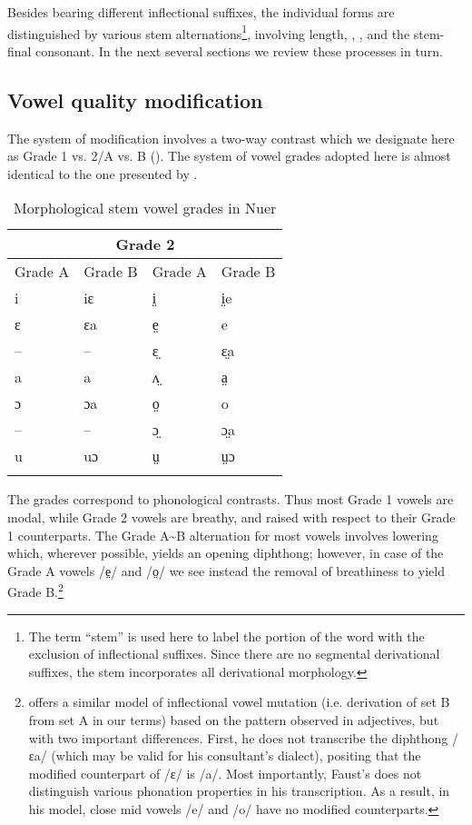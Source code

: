 \documentclass[output=paper,newtxmath,modfonts,nonflat]{langsci/langscibook}
\begin{document}
Besides bearing different inflectional suffixes, the individual forms are distinguished by various stem alternations\footnote{The term “stem” is used here to label the portion of the word with the exclusion of inflectional suffixes. Since there are no segmental derivational suffixes, the stem incorporates all derivational morphology.}, involving length, , , and the stem-final consonant. In the next several sections we review these processes in turn. 

\subsection{Vowel quality modification} %

The system of  modification involves a two-way contrast which we designate here as Grade 1 vs. 2/A vs. B (). The system of vowel grades adopted here is almost identical to the one presented by \citet{reid2016}.

\begin{table}
\begin{tabularx}{\textwidth}{XXXX}
\lsptoprule

\multicolumn{2}{c}{Grade 1} & \multicolumn{2}{c}{Grade 2}\\
\midrule
  Grade A &  Grade B &  Grade A &  Grade B\\
 i & iɛ & i̤ & i̤e\\
 ɛ & ɛa & e̤ & e\\
 -- & -- & ɛ̤ & ɛ̤a\\
 a & a & ʌ̤ & a̤\\
 ɔ & ɔa & o̤ & o\\
 -- & -- & ɔ̤ & ɔ̤a\\
 u & uɔ & ṳ & ṳɔ\\
\lspbottomrule
\end{tabularx}
\caption{Morphological stem vowel grades in Nuer}
\label{tab:monich:4}
\end{table}

The grades correspond to phonological contrasts. Thus most Grade 1 vowels are modal, while Grade 2 vowels are breathy, and raised with respect to their Grade 1 counterparts. The Grade A{\textasciitilde}B alternation for most vowels involves lowering which, wherever possible, yields an opening diphthong; however, in case of the Grade A vowels /e̤/ and /o̤/ we see instead the removal of breathiness to yield Grade B.\footnote{\citet{Faust2017} offers a similar model of inflectional vowel mutation (i.e. derivation of set B from set A in our terms) based on the pattern observed in adjectives, but with two important differences. First, he does not transcribe the diphthong /ɛa/ (which may be valid for his consultant’s dialect), positing that the modified counterpart of /ɛ/ is /a/. Most importantly, Faust’s does not distinguish various phonation properties in his transcription. As a result, in his model, close mid vowels /e/ and /o/ have no modified counterparts.}  
\end{document}
